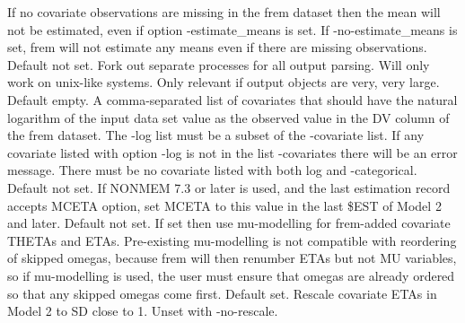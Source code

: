 \begin{optionlist}
If no covariate observations are missing in the frem dataset then the mean will not be estimated,
even if option -estimate\_means is set. If -no-estimate\_means is set, frem will not estimate
any means even if there are missing observations.
\nextopt
{}
Default not set. Fork out separate processes for all output parsing. Will only work on unix-like systems.
Only relevant if output objects are very, very large.
\nextopt
{}
Default empty. A comma-separated list of covariates	that should have the natural logarithm of the input data
set value as the observed value in the DV column of the frem dataset. The -log list must be a subset of the
-covariate list. If any covariate listed with option -log is not in the list -covariates there will be an
error message. There must be no covariate listed with both log and -categorical.
\nextopt
{}
Default not set. If NONMEM 7.3 or later is used, and the last estimation record accepts MCETA option, set MCETA to this value
in the last \$EST of Model 2 and later.
\nextopt
{}
Default not set. If set then use mu-modelling for frem-added covariate THETAs and ETAs. Pre-existing
mu-modelling is not compatible with reordering of skipped omegas, because frem will then renumber ETAs
but not MU variables, so if mu-modelling is used, the user must ensure that omegas are already ordered
so that any skipped omegas come first.
\nextopt
{}
Default set. Rescale covariate ETAs in Model 2 to SD close to 1. Unset with -no-rescale.

\end{optionlist}
